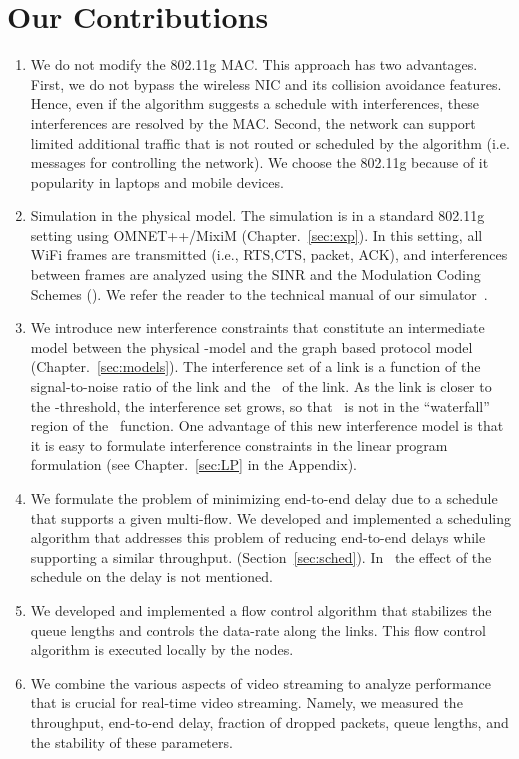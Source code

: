 \documentclass[12pt,oneside,english,a4paper]{book}
\theoremstyle{plain}
\theoremstyle{definition}
\theoremstyle{Theorem}
\theoremstyle{plain}
\newenvironment{proof sketch}[1]{\noindent {\emph{Proof sketch of #1:}}}{\hfill \qed}
\newcommand{\SINR}{\text{\sc{sinr}}}
\newcommand{\PER}{\text{\sc{per}}}
\newcommand{\MCS}{\text{\sc{mcs}}}
\begin{document}
\section{Our Contributions}
\begin{enumerate}
\item We do not modify the 802.11g MAC. This approach has two
  advantages. First, we do not bypass the wireless NIC and its
  collision avoidance features. Hence, even if the algorithm suggests
  a schedule with interferences, these interferences are resolved by
  the MAC. Second, the network can support limited additional traffic
  that is not routed or scheduled by the algorithm (i.e. messages for
  controlling the network). We choose the 802.11g because of it
  popularity in laptops and mobile devices.
\item Simulation in the physical model. The simulation is in a
  standard 802.11g setting using OMNET++/MixiM (Chapter.~\ref{sec:exp}).
  In this setting, all WiFi frames are transmitted (i.e., RTS,CTS,
  packet, ACK), and interferences between frames are analyzed using
  the SINR and the  Modulation Coding Schemes (\MCS). 
  We refer the reader to the technical manual of our simulator~\cite{YF}.
\item We introduce new interference constraints that constitute an
  intermediate model between the physical \SINR-model and the graph
  based protocol model (Chapter.~\ref{sec:models}). The interference set
  of a link is a function of the signal-to-noise ratio of the link and
  the \MCS\ of the link.  As the link is closer to the
  \SINR-threshold, the interference set grows, so that \SINR\ is not
  in the ``waterfall'' region of the \PER\ function.  One advantage of
  this new interference model is that it is easy to formulate
  interference constraints in the linear program formulation
  (see Chapter.~\ref{sec:LP} in the Appendix).
\item We formulate the problem of minimizing end-to-end delay due to a
  schedule that supports a given multi-flow. We developed and
  implemented a scheduling algorithm that addresses this problem of
  reducing end-to-end delays while supporting a similar throughput.
  (Section~\ref{sec:sched}).
  In~\cite{kumar2005algorithmic,alicherry2005joint11,buragohain2007improved}
  the effect of the schedule on the delay is not mentioned.
\item We developed and implemented a flow control algorithm that
  stabilizes the queue lengths and controls the data-rate along the
  links.  This flow control algorithm is executed locally by the
  nodes.
\item We combine the various aspects of video streaming to analyze
  performance that is crucial for real-time video streaming.  Namely,
  we measured the throughput, end-to-end delay, fraction of dropped
  packets, queue lengths, and the stability of these parameters.
\end{enumerate}
\end{document}
